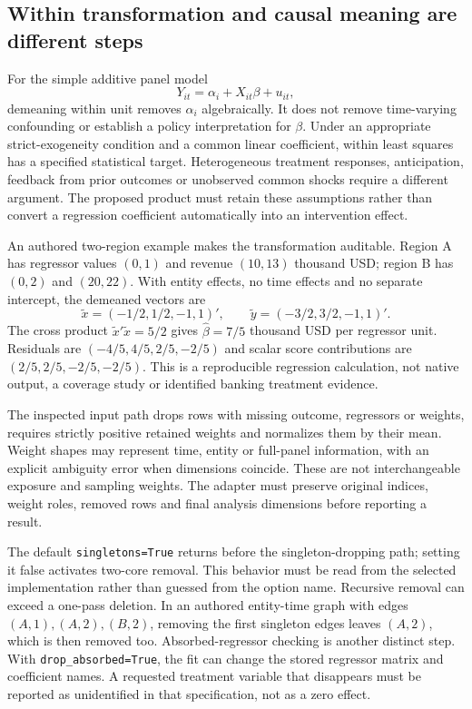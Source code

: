 \subsection{Within transformation and causal meaning are different steps}
For the simple additive panel model
\[
 Y_{it}=\alpha_i+X_{it}\beta+u_{it},
\]
demeaning within unit removes $\alpha_i$ algebraically. It does not remove
time-varying confounding or establish a policy interpretation for $\beta$.
Under an appropriate strict-exogeneity condition and a common linear
coefficient, within least squares has a specified statistical target.
Heterogeneous treatment responses, anticipation, feedback from prior
outcomes or unobserved common shocks require a different argument. The
proposed product must retain these assumptions rather than convert a
regression coefficient automatically into an intervention effect.
\citep{exec24_lmpanel_reference}

An authored two-region example makes the transformation auditable. Region A
has regressor values $(0,1)$ and revenue $(10,13)$ thousand USD; region B has
$(0,2)$ and $(20,22)$. With entity effects, no time effects and no separate
intercept, the demeaned vectors are
\[
 \widetilde x=(-1/2,1/2,-1,1)',\qquad
 \widetilde y=(-3/2,3/2,-1,1)'.
\]
The cross product $\widetilde x'\widetilde x=5/2$ gives
$\widehat\beta=7/5$ thousand USD per regressor unit. Residuals are
$(-4/5,4/5,2/5,-2/5)$ and scalar score contributions are
$(2/5,2/5,-2/5,-2/5)$. This is a reproducible regression calculation, not
native output, a coverage study or identified banking treatment evidence.
\citep{exec24_lmpanel_reference}

The inspected input path drops rows with missing outcome, regressors or
weights, requires strictly positive retained weights and normalizes them
by their mean. Weight shapes may represent time, entity or full-panel
information, with an explicit ambiguity error when dimensions coincide.
These are not interchangeable exposure and sampling weights. The adapter
must preserve original indices, weight roles, removed rows and final
analysis dimensions before reporting a result.
\citep{exec24_lmpanel_source}

The default \texttt{singletons=True} returns before the singleton-dropping
path; setting it false activates two-core removal. This behavior must be
read from the selected implementation rather than guessed from the option
name. Recursive removal can exceed a one-pass deletion. In an authored
entity-time graph with edges $(A,1),(A,2),(B,2)$, removing the first singleton
edges leaves $(A,2)$, which is then removed too. Absorbed-regressor checking
is another distinct step. With \texttt{drop\_absorbed=True}, the fit can
change the stored regressor matrix and coefficient names. A requested
treatment variable that disappears must be reported as unidentified in
that specification, not as a zero effect.
\citep{exec24_lmpanel_source,exec24_lmpanel_reference}


